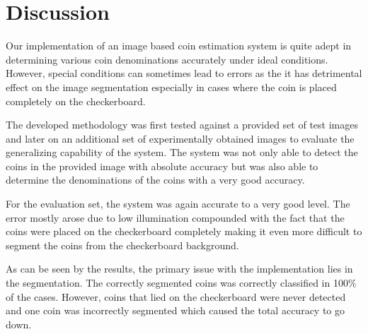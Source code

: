 \documentclass[report.tex]{subfile}
\begin{document}
\section{Discussion}

Our implementation of an image based coin estimation system is quite adept in
determining various coin denominations accurately under ideal conditions.
However, special conditions can sometimes lead to errors as the it has
detrimental effect on the image segmentation especially in cases where the coin
is placed completely on the checkerboard.

The developed methodology was first tested against a provided set of test
images and later on an additional set of experimentally obtained images to
evaluate the generalizing capability of the system. The system was not only
able to detect the coins in the provided image with absolute accuracy but was
also able to determine the denominations of the coins with a very good
accuracy.

For the evaluation set, the system was again accurate to a very good level. The
error mostly arose due to low illumination compounded with the fact that the
coins were placed on the checkerboard completely making it even more difficult
to segment the coins from the checkerboard background.

As can be seen by the results, the primary issue with the implementation lies
in the segmentation. The correctly segmented coins was correctly classified in
100\% of the cases. However, coins that lied on the checkerboard were never
detected and one coin was incorrectly segmented which caused the total accuracy
to go down.
\end{document}

